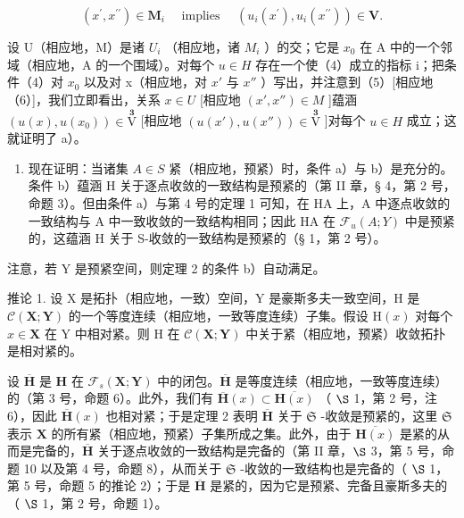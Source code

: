 \[
(x ^ {\prime}, x ^ {\prime \prime}) \in \mathbf {M} _ {i} \quad \text { implies } \quad (u _ {i} (x ^ {\prime}), u _ {i} (x ^ {\prime \prime})) \in \mathbf {V}.\tag{6}
\]

设 U（相应地，M）是诸 \(U_{i}\) （相应地，诸 \(M_{i}\) ）的交；它是 \(x_{0}\) 在 A 中的一个邻域（相应地，A 的一个围域）。对每个 \(u \in H\) 存在一个使（4）成立的指标 i；把条件（4）对 \(x_{0}\) 以及对 x（相应地，对 \(x'\) 与 \(x''\) ）写出，并注意到（5）{[}相应地（6）{]}，我们立即看出，关系 \(x \in U\) {[}相应地 \((x', x'') \in M\) {]}蕴涵 \((u(x), u(x_{0})) \in \overset{\mathbf{3}}{\mathrm{V}}\) {[}相应地 \((u(x'), u(x'')) \in \overset{\mathbf{3}}{\mathrm{V}}\) {]}对每个 \(u \in H\) 成立；这就证明了 a）。

\begin{enumerate}
\def\labelenumi{\arabic{enumi})}
\setcounter{enumi}{1}
\tightlist
\item
  现在证明：当诸集 \(A \in S\) 紧（相应地，预紧）时，条件 a）与 b）是充分的。条件 b）蕴涵 H 关于逐点收敛的一致结构是预紧的（第 II 章，§ 4，第 2 号，命题 3）。但由条件 a）与第 4 号的定理 1 可知，在 H\textbar A 上，A 中逐点收敛的一致结构与 A 中一致收敛的一致结构相同；因此 H\textbar A 在 \(\mathcal{F}_{u}(A; Y)\) 中是预紧的，这蕴涵 H 关于 S-收敛的一致结构是预紧的（§ 1，第 2 号）。
\end{enumerate}

注意，若 Y 是预紧空间，则定理 2 的条件 b）自动满足。

推论 1. 设 X 是拓扑（相应地，一致）空间，Y 是豪斯多夫一致空间，H 是 \(\mathcal{C}(\mathbf{X};\mathbf{Y})\) 的一个等度连续（相应地，一致等度连续）子集。假设 \(\mathrm{H}(x)\) 对每个 \(x\in \mathbf{X}\) 在 Y 中相对紧。则 H 在 \(\mathcal{C}(\mathbf{X};\mathbf{Y})\) 中关于紧（相应地，预紧）收敛拓扑是相对紧的。

设 \(\overline{\mathbf{H}}\) 是 \(\mathbf{H}\) 在 \(\mathcal{F}_s(\mathbf{X};\mathbf{Y})\) 中的闭包。\(\overline{\mathbf{H}}\) 是等度连续（相应地，一致等度连续）的（第 3 号，命题 6）。此外，我们有 \(\overline{\mathbf{H}}(x)\subset \overline{\mathbf{H}(x)}\) （ \(\S\) 1，第 2 号，注 6），因此 \(\overline{\mathbf{H}}(x)\) 也相对紧；于是定理 2 表明 \(\overline{\mathbf{H}}\) 关于 \(\mathfrak{S}\) -收敛是预紧的，这里 \(\mathfrak{S}\) 表示 \(\mathbf{X}\) 的所有紧（相应地，预紧）子集所成之集。此外，由于 \(\overline{\mathbf{H}(x)}\) 是紧的从而是完备的，\(\overline{\mathbf{H}}\) 关于逐点收敛的一致结构是完备的（第 II 章，\(\S\) 3，第 5 号，命题 10 以及第 4 号，命题 8），从而关于 \(\mathfrak{S}\) -收敛的一致结构也是完备的（ \(\S\) 1，第 5 号，命题 5 的推论 2）；于是 \(\overline{\mathbf{H}}\) 是紧的，因为它是预紧、完备且豪斯多夫的（ \(\S\) 1，第 2 号，命题 1）。

